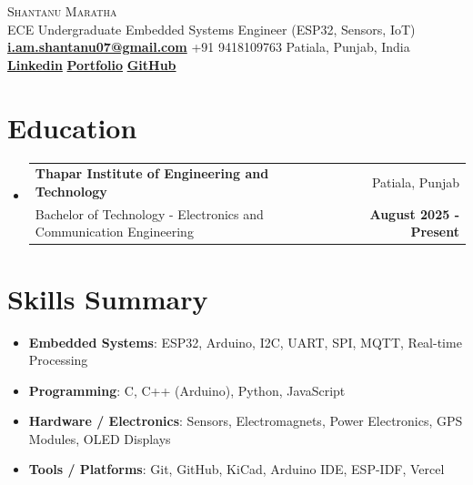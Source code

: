 \documentclass[a4paper,11pt]{article}
\makeatletter
\newcommand{\resumeItem}[2]{
  \item\small{
    \textbf{#1}{: #2}
  }
}
\newcommand{\resumeSubheading}[4]{
  \vspace{-1pt}\item
    \begin{tabular*}{0.97\textwidth}{l@{\extracolsep{\fill}}r}
      \textbf{#1} & #2 \\
      #3 & \textbf{#4} \\
    \end{tabular*}\vspace{-5pt}
}
\newcommand{\resumeSubItem}[2]{\resumeItem{#1}{#2}\vspace{-3pt}}
\newcommand{\resumeSubHeadingListStart}{\begin{itemize}[leftmargin=*]}
\newcommand{\resumeSubHeadingListEnd}{\end{itemize}}
\makeatother
\begin{document}
\begin{center}
  {\Huge \scshape Shantanu Maratha} \\
  \vspace{2pt}
  \small ECE Undergraduate \textbar{} Embedded Systems Engineer (ESP32, Sensors, IoT) \\
  \vspace{2pt}
  \href{mailto:i.am.shantanu07@gmail.com}{\textbf{i.am.shantanu07@gmail.com}} \textbar{} +91 9418109763 \textbar{} Patiala, Punjab, India \\
  \vspace{2pt}
  \href{https://www.linkedin.com/in/shantanu-maratha28/}{\textbf{Linkedin}} \textbar{} \href{https://shantanu-vsc-portfolio.vercel.app}{\textbf{Portfolio}} \textbar{} \href{https://github.com/shaxntanu}{\textbf{GitHub}}
\end{center}

\section{Education}
  \resumeSubHeadingListStart
    \resumeSubheading
      {Thapar Institute of Engineering and Technology}{Patiala, Punjab}
      {Bachelor of Technology - Electronics and Communication Engineering}{August 2025 - Present}
    \resumeSubHeadingListEnd
	    
\vspace{-5pt}
\section{Skills Summary}
	\resumeSubHeadingListStart
	\resumeSubItem{Embedded Systems}{ESP32, Arduino, I2C, UART, SPI, MQTT, Real-time Processing}
	\resumeSubItem{Programming}{C, C++ (Arduino), Python, JavaScript}
	\resumeSubItem{Hardware / Electronics}{Sensors, Electromagnets, Power Electronics, GPS Modules, OLED Displays}
	\resumeSubItem{Tools / Platforms}{Git, GitHub, KiCad, Arduino IDE, ESP-IDF, Vercel}

\resumeSubHeadingListEnd

\vspace{-5pt}
\end{document}
